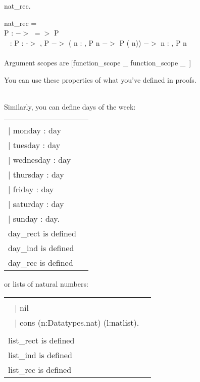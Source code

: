 \begin{code}	 nat\_rec.		\end{code}
\begin{msg}	
	nat\_rec = 								\\
	 P :  $->$  $=>$  P				\\ \-\ \qquad
		:  P :  -$>$ ,					
		  P  $->$						
       			( n : , P n $->$ P ( n)) $->$  n : , P n 
	\\ \\
	Argument scopes are [function\_scope \_ function\_scope \_\ ]
\end{msg}

\noindent
You can use these properties of what you've defined in proofs.

~\\
\noindent
Similarly, you can define days of the week:

\hspace{-1cm}
\begin{tabular}{p{8cm} p{8cm}}
\begin{code}
\Inductive \nm{day}: \Type :=	\\ \-\quad
 $\mid$ monday : day		\\ \-\quad
 $\mid$ tuesday : day		\\ \-\quad
 $\mid$ wednesday : day		\\ \-\quad
 $\mid$ thursday : day		\\ \-\quad
 $\mid$ friday : day			\\ \-\quad
 $\mid$ saturday : day		\\ \-\quad
 $\mid$ sunday : day.
\end{code}
&
\begin{msg}			
day is defined			\\
day\_rect is defined		\\
day\_ind is defined		\\
day\_rec is defined		
\end{msg}
\end{tabular}


\noindent
or lists of natural numbers:

\hspace{-1cm}
\begin{tabular}{p{8cm} p{8cm}}
\begin{code}
\Inductive \nm{natlist} \ty{Type} :=			\\ \-\ \quad
$\mid$ nil								\\ \-\ \quad
$\mid$ cons (n:Datatypes.nat) (l:natlist).		\\
\end{code}
&
\begin{msg}
list is defined			\\
list\_rect is defined		\\
list\_ind is defined		\\
list\_rec is defined		
\end{msg}
\end{tabular}



